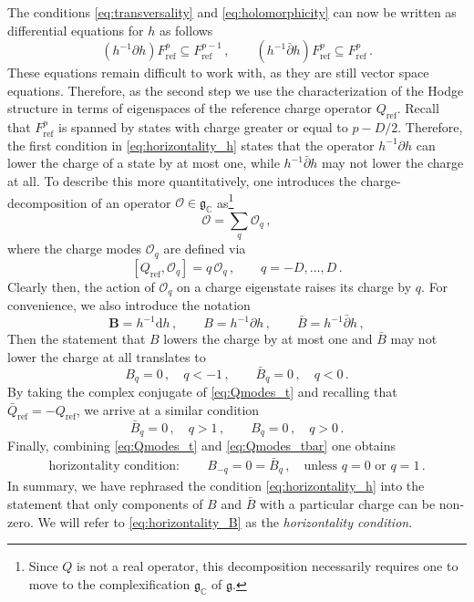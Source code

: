 \documentclass[11pt,a4paper]{article}
\numberwithin{equation}{section}
\numberwithin{table}{section}\setlength{\multlinegap}{25pt}
\newcommand{\dd}{\mathrm{d}}
\begin{document}
The conditions \eqref{eq:transversality} and \eqref{eq:holomorphicity} can now be written as differential equations for $h$ as follows
\begin{equation}\label{eq:horizontality_h}
	(h^{-1}\partial h)F_{\mathrm{ref}}^p \subseteq F_{\mathrm{ref}}^{p-1}\,,\qquad  (h^{-1}\bar{\partial} h)F_{\mathrm{ref}}^p \subseteq F_{\mathrm{ref}}^p\,.
\end{equation}
These equations remain difficult to work with, as they are still vector space equations. Therefore, as the second step we use the characterization of the Hodge structure in terms of eigenspaces of the reference charge operator $Q_{\mathrm{ref}}$. Recall that $F^p_{\mathrm{ref}}$ is spanned by states with charge greater or equal to $p-D/2$. Therefore, the first condition in \eqref{eq:horizontality_h} states that the operator $h^{-1}\partial h$ can lower the charge of a state by at most one, while $h^{-1}\bar{\partial}h$ may not lower the charge at all. To describe this more quantitatively, one introduces the charge-decomposition of an operator $\mathcal{O}\in \mathfrak{g}_{\mathbb{C}}$ as\footnote{Since $Q$ is not a real operator, this decomposition necessarily requires one to move to the complexification $\mathfrak{g}_\mathbb{C}$ of $\mathfrak{g}$.}
\begin{equation}
	\mathcal{O} = \sum_{q} \mathcal{O}_q\,,
\end{equation}
where the charge modes $\mathcal{O}_q$ are defined via
\begin{equation}\label{eq:q_mode}
	[Q_{\mathrm{ref}}, \mathcal{O}_q] = q\, \mathcal{O}_q\,,\qquad q=-D,\ldots, D\,.
\end{equation}
Clearly then, the action of $\mathcal{O}_q$ on a charge eigenstate raises its charge by $q$. For convenience, we also introduce the notation
\begin{equation}\label{eq:def_B}
	\mathbf{B}=h^{-1}\dd h\,,\qquad B = h^{-1}\partial h\,,\qquad \bar{B} = h^{-1}\bar{\partial}h\,,
\end{equation}
Then the statement that $B$ lowers the charge by at most one and $\bar{B}$ may not lower the charge at all translates to
\begin{equation}\label{eq:Qmodes_t}
	B_q = 0\,,\quad q< -1\,,\qquad \bar{B}_q = 0\,,\quad q< 0\,.
\end{equation} 
By taking the complex conjugate of \eqref{eq:Qmodes_t} and recalling that $\bar{Q}_{\mathrm{ref}} = -Q_{\mathrm{ref}}$, we arrive at a similar condition
\begin{equation}\label{eq:Qmodes_tbar}
	\bar{B}_q = 0\,,\quad q> 1\,,\qquad B_q = 0\,,\quad q> 0\, .
\end{equation} 
Finally, combining \eqref{eq:Qmodes_t} and \eqref{eq:Qmodes_tbar} one obtains
\begin{align}\label{eq:horizontality_B}
\boxed{\quad \text{horizontality condition}:\qquad 
	B_{-q} = 0 = 
	\bar{B}_q \,,\quad \text{unless $q=0$ or $q=1$}\,.\quad }
\end{align}
In summary, we have rephrased the condition \eqref{eq:horizontality_h} into the statement that only components of $B$ and $\bar{B}$ with a particular charge can be non-zero. We will refer to \eqref{eq:horizontality_B} as the \textit{horizontality condition}. 
\end{document}
